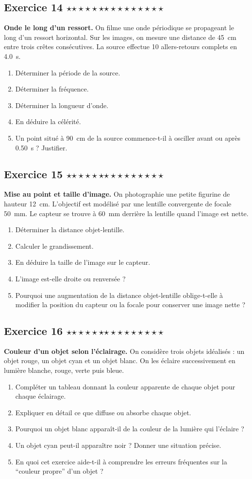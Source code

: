 \documentclass[11pt,a4paper]{article}
\newcommand{\etoiles}[1]{%
\ifcase#1\or $\star$\or $\star\star$\or $\star\star\star$\or $\star\star\star\star$\or $\star\star\star\star\star$\fi}
\newcommand{\exostar}[2]{\subsection*{Exercice #1 \hfill \etoiles{#2}}}
\begin{document}
\exostar{14}{3}
\textbf{Onde le long d'un ressort.} On filme une onde périodique se propageant le long d'un ressort horizontal. Sur les images, on mesure une distance de \SI{45}{cm} entre trois crêtes consécutives. La source effectue 10 allers-retours complets en \SI{4,0}{s}.
\begin{enumerate}[label=\alph*)]
    \item Déterminer la période de la source.
    \item Déterminer la fréquence.
    \item Déterminer la longueur d'onde.
    \item En déduire la célérité.
    \item Un point situé à \SI{90}{cm} de la source commence-t-il à osciller avant ou après \SI{0,50}{s} ? Justifier.
\end{enumerate}

\exostar{15}{3}
\textbf{Mise au point et taille d'image.} On photographie une petite figurine de hauteur \SI{12}{cm}. L'objectif est modélisé par une lentille convergente de focale \SI{50}{mm}. Le capteur se trouve à \SI{60}{mm} derrière la lentille quand l'image est nette.
\begin{enumerate}[label=\alph*)]
    \item Déterminer la distance objet-lentille.
    \item Calculer le grandissement.
    \item En déduire la taille de l'image sur le capteur.
    \item L'image est-elle droite ou renversée ?
    \item Pourquoi une augmentation de la distance objet-lentille oblige-t-elle à modifier la position du capteur ou la focale pour conserver une image nette ?
\end{enumerate}

\exostar{16}{4}
\textbf{Couleur d'un objet selon l'éclairage.} On considère trois objets idéalisés : un objet rouge, un objet cyan et un objet blanc. On les éclaire successivement en lumière blanche, rouge, verte puis bleue.
\begin{enumerate}[label=\alph*)]
    \item Compléter un tableau donnant la couleur apparente de chaque objet pour chaque éclairage.
    \item Expliquer en détail ce que diffuse ou absorbe chaque objet.
    \item Pourquoi un objet blanc apparaît-il de la couleur de la lumière qui l'éclaire ?
    \item Un objet cyan peut-il apparaître noir ? Donner une situation précise.
    \item En quoi cet exercice aide-t-il à comprendre les erreurs fréquentes sur la ``couleur propre'' d'un objet ?
\end{enumerate}
\end{document}
